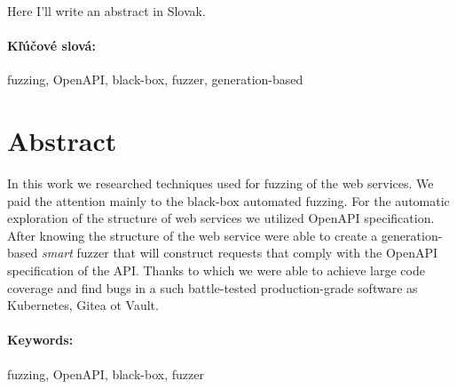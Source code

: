 \documentclass[12pt, twoside]{book}
\begin{document}
Here I'll write an abstract in Slovak.

\paragraph*{Kľúčové slová:} fuzzing, OpenAPI, black-box, fuzzer, generation-based


\newpage
\section*{Abstract}
In this work we researched techniques used for fuzzing of the web services. We paid the attention mainly to the black-box automated fuzzing. For the automatic exploration of the structure of web services we utilized OpenAPI specification. After knowing the structure of the web service were able to create a generation-based \textit{smart} fuzzer that will construct requests that comply with the OpenAPI specification of the API. Thanks to which we were able to achieve large code coverage and find bugs in a such battle-tested production-grade software as Kubernetes, Gitea ot Vault.

\paragraph*{Keywords:} fuzzing, OpenAPI, black-box, fuzzer




\newpage

\tableofcontents



\newpage

\listoffigures
\listoftables


\mainmatter












\newpage

\backmatter

\thispagestyle{empty}
\clearpage



\end{document}
